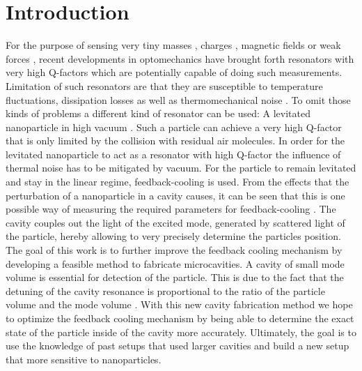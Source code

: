 \chapter{Introduction}
For the purpose of sensing very tiny masses \cite{chaste2012nanomechanical, yang2006zeptogram}, charges \cite{cleland1998nanometre}, magnetic fields \cite{rugar2004single} or weak forces \cite{stipe2001noncontact, moser2013ultrasensitive}, recent developments in optomechanics \cite{arndt2014testing, aspelmeyer2012quantum, aspelmeyer2014cavity} have brought forth resonators with very high Q-factors which are potentially capable of doing such measurements. Limitation of such resonators are that they are susceptible to temperature fluctuations, dissipation losses as well as thermomechanical noise \cite{ekinci2004ultimate, aspelmeyer2012quantum, postma2005dynamic}. To omit those kinds of problems a different kind of resonator can be used: A levitated nanoparticle in high vacuum \cite{gieseler2013thermal}. Such a particle can achieve a very high Q-factor that is only limited by the collision with residual air molecules. In order for the levitated nanoparticle to act as a resonator with high Q-factor the influence of thermal noise has to be mitigated by vacuum. For the particle to remain levitated and stay in the linear regime, feedback-cooling is used. From the effects that the perturbation of a nanoparticle in a cavity causes, it can be seen that this is one possible way of measuring the required parameters for feedback-cooling \cite{tanjiinteraction, chang2010cavity}. The cavity couples out the light of the excited mode, generated by scattered light of the particle, hereby allowing to very precisely determine the particles position.\\
The goal of this work is to further improve the feedback cooling mechanism by developing a feasible method to fabricate microcavities. A cavity of small mode volume is essential for detection of the particle. This is due to the fact that the detuning of the cavity resonance is proportional to the ratio of the particle volume and the mode volume \cite{chang2010cavity}. With this new cavity fabrication method we hope to optimize the feedback cooling mechanism by being able to determine the exact state of the particle inside of the cavity more accurately. Ultimately, the goal is to use the knowledge of past setups that used larger cavities and build a new setup that more sensitive to nanoparticles.







